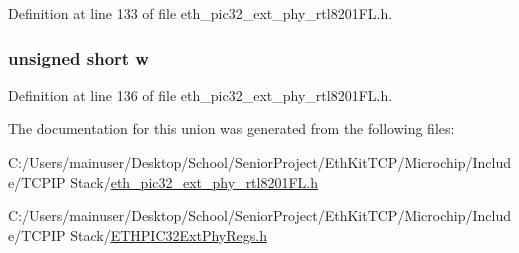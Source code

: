 Definition at line 133 of file eth\+\_\+pic32\+\_\+ext\+\_\+phy\+\_\+rtl8201\+F\+L.\+h.

\hypertarget{union_____p_h_y_i_d1bits__t_a160850a4684a3e82c2323033964f2e98}{}
\subsubsection[{w}]{\setlength{\rightskip}{0pt plus 5cm}unsigned short w}\label{union_____p_h_y_i_d1bits__t_a160850a4684a3e82c2323033964f2e98}


Definition at line 136 of file eth\+\_\+pic32\+\_\+ext\+\_\+phy\+\_\+rtl8201\+F\+L.\+h.



The documentation for this union was generated from the following files\+:\begin{DoxyCompactItemize}
\item 
C\+:/\+Users/mainuser/\+Desktop/\+School/\+Senior\+Project/\+Eth\+Kit\+T\+C\+P/\+Microchip/\+Include/\+T\+C\+P\+I\+P Stack/\hyperlink{eth__pic32__ext__phy__rtl8201_f_l_8h}{eth\+\_\+pic32\+\_\+ext\+\_\+phy\+\_\+rtl8201\+F\+L.\+h}\item 
C\+:/\+Users/mainuser/\+Desktop/\+School/\+Senior\+Project/\+Eth\+Kit\+T\+C\+P/\+Microchip/\+Include/\+T\+C\+P\+I\+P Stack/\hyperlink{_e_t_h_p_i_c32_ext_phy_regs_8h}{E\+T\+H\+P\+I\+C32\+Ext\+Phy\+Regs.\+h}\end{DoxyCompactItemize}
